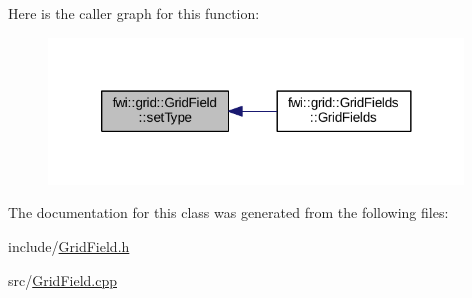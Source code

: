Here is the caller graph for this function\-:\nopagebreak
\begin{figure}[H]
\begin{center}
\leavevmode
\includegraphics[width=312pt]{classfwi_1_1grid_1_1GridField_ae1bf4d331ed2be13c2c76b90c6bd100d_icgraph}
\end{center}
\end{figure}




The documentation for this class was generated from the following files\-:\begin{DoxyCompactItemize}
\item 
include/\hyperlink{GridField_8h}{Grid\-Field.\-h}\item 
src/\hyperlink{GridField_8cpp}{Grid\-Field.\-cpp}\end{DoxyCompactItemize}
